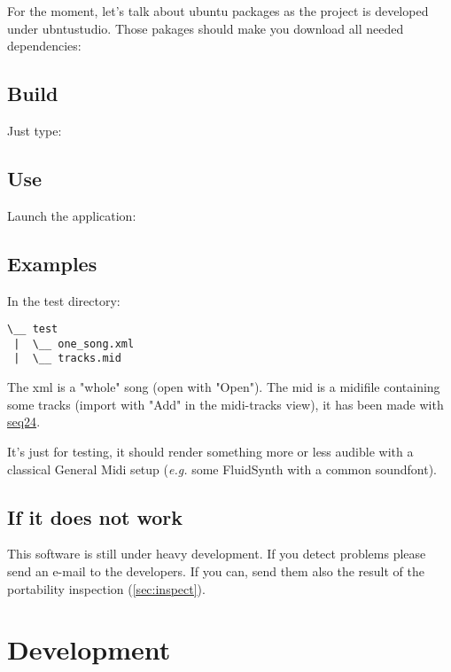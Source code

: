 For the moment, let's talk about ubuntu packages as the project is developed
under ubntustudio. Those pakages should make you download all needed
dependencies:


\subsection{Build}

Just type:


\subsection{Use}

Launch the application:


\subsection{Examples}
In the test directory:

\begin{verbatim}
\__ test
 |  \__ one_song.xml
 |  \__ tracks.mid
\end{verbatim}

The xml is a "whole" song (open with "Open").  The mid is a midifile containing
some tracks (import with "Add" in the midi-tracks view), it has been made with
\href{http://www.filter24.org/seq24/}{seq24}.

It's just for testing, it should render something more or less audible with a
classical General Midi setup (\textit{e.g.} some FluidSynth with a common
soundfont).

\subsection{If it does not work}

This software is still under heavy development. If you detect problems please
send an e-mail to the developers. If you can, send them also the result of the
portability inspection (\ref{sec:inspect}).


\section{Development}

